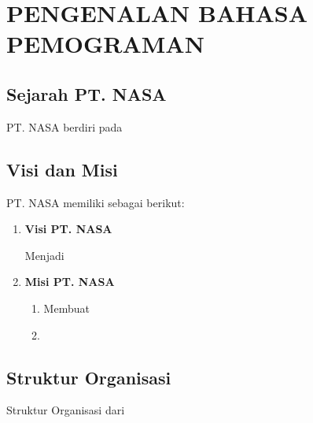 \chapter{PENGENALAN BAHASA PEMOGRAMAN}


\section{Sejarah PT. NASA}

PT. NASA berdiri pada \lipsum[11]

\lipsum[12][1-10]

\section{Visi dan Misi}

PT. NASA memiliki \lipsum[13][1-3] sebagai berikut:

\begin{enumerate}[nolistsep]

  \item \textbf{Visi PT. NASA}

  Menjadi \lipsum[13][4-7]

  \item \textbf{Misi PT. NASA}

  \begin{enumerate}[nolistsep]

    \item Membuat \lipsum[13][8-9]

    \item \lipsum[13][10-12]

  \end{enumerate}

\end{enumerate}

\section{Struktur Organisasi}

Struktur Organisasi dari \lipsum[14][1-8]

